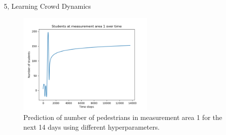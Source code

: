 \documentclass[10pt,a4paper]{article}
\begin{document}
\begin{task}{5, Learning Crowd Dynamics}
\begin{figure}[H]
\centering
\includegraphics[width=0.6\textwidth]{../plots/task5_4.png}
\caption{Prediction of number of pedestrians in measurement area 1 for the next 14 days using different hyperparameters.}
\label{fig:task5_4_2}
\end{figure}

\end{task}
\end{document}
